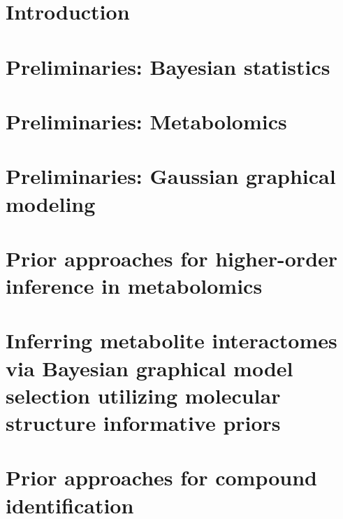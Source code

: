 \documentclass[final]{ulthesis}
\begin{document}
\tableofcontents \clearpage
\listoftables \clearpage
\listoffigures \clearpage

\mainmatter


\chapter{Introduction}


\chapter{Preliminaries: Bayesian statistics}


\chapter{Preliminaries: Metabolomics}


\chapter{Preliminaries: Gaussian graphical modeling}


\chapter{Prior approaches for higher-order inference in metabolomics}

\chapter{Inferring metabolite interactomes via Bayesian graphical model selection utilizing molecular structure informative priors}

\chapter{Prior approaches for compound identification}
\end{document}
